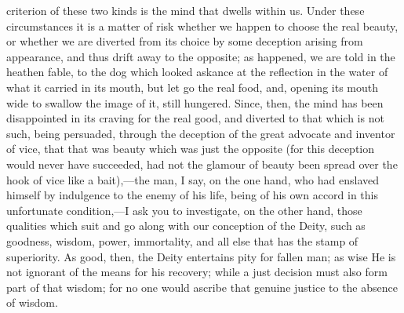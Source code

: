 criterion of these two kinds is the mind that dwells within us. Under these circumstances it is a matter of risk whether we happen to choose the real beauty, or whether we are diverted from its choice by some deception arising from appearance, and thus drift away to the opposite; as happened, we are told in the heathen fable, to the dog which looked askance at the reflection in the water of what it carried in its mouth, but let go the real food, and, opening its mouth wide to swallow the image of it, still hungered. Since, then, the mind has been disappointed in its craving for the real good, and diverted to that which is not such, being persuaded, through the deception of the great advocate and inventor of vice, that that was beauty which was just the opposite (for this deception would never have succeeded, had not the glamour of beauty been spread over the hook of vice like a bait),—the man, I say, on the one hand, who had enslaved himself by indulgence to the enemy of his life, being of his own accord in this unfortunate condition,—I ask you to investigate, on the other hand, those qualities which suit and go along with our conception of the Deity, such as goodness, wisdom, power, immortality, and all else that has the stamp of superiority. As good, then, the Deity entertains pity for fallen man; as wise He is not ignorant of the means for his recovery; while a just decision must also form part of that wisdom; for no one would ascribe that genuine justice to the absence of wisdom.


